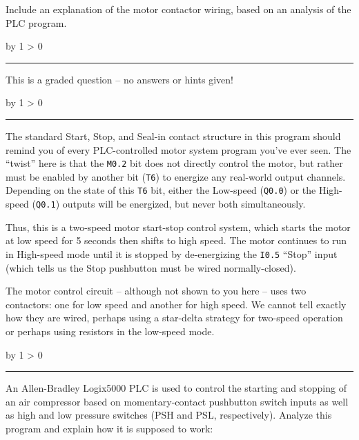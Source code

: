 \documentclass[12pt,a4paper]{article}
\def\oppgave{
            \advance\questnum by 1
            \ifnum \questnum > 0
                 \hrule
                 \vskip 3pt
                 \leftline{Oppgave \the\questnum}
                 \vskip 3pt \fi}
\def\svar{
           \advance\answnum by 1
           \ifnum \answnum > 0
                \hrule
                \vskip 3pt
                \leftline{Svar \the\answnum}
                \vskip 3pt \fi}
\def\notes{
           \advance\explnum by 1
           \ifnum \explnum > 0
                \hrule
                \vskip 3pt
                \leftline{Notes \the\explnum}
                \vskip 3pt \fi}
\begin{document}
Include an explanation of the motor contactor wiring, based on an analysis of the PLC program.

\vfil

\eject
\vskip 10pt \filbreak 





\svar{} 

This is a graded question -- no answers or hints given!

\vskip 10pt \filbreak 





\notes{} 

The standard Start, Stop, and Seal-in contact structure in this program should remind you of every PLC-controlled motor system program you've ever seen.  The ``twist'' here is that the {\tt M0.2} bit does not directly control the motor, but rather must be enabled by another bit ({\tt T6}) to energize any real-world output channels.  Depending on the state of this {\tt T6} bit, either the Low-speed ({\tt Q0.0}) or the High-speed ({\tt Q0.1}) outputs will be energized, but never both simultaneously.

\vskip 10pt

Thus, this is a two-speed motor start-stop control system, which starts the motor at low speed for 5 seconds then shifts to high speed.  The motor continues to run in High-speed mode until it is stopped by de-energizing the {\tt I0.5} ``Stop'' input (which tells us the Stop pushbutton must be wired normally-closed).  

The motor control circuit -- although not shown to you here -- uses two contactors: one for low speed and another for high speed.  We cannot tell exactly how they are wired, perhaps using a star-delta strategy for two-speed operation or perhaps using resistors in the low-speed mode.


\vfil \eject 




\oppgave{} 

An Allen-Bradley Logix5000 PLC is used to control the starting and stopping of an air compressor based on momentary-contact pushbutton switch inputs as well as high and low pressure switches (PSH and PSL, respectively).  Analyze this program and explain how it is supposed to work:
\end{document}
